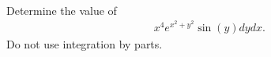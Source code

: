 \item %
\\
Determine the value of
\begin{align*}
  \mathop{\int_0^{\pi} \!\! \int_{-1}^1} x^4e^{x^2 + y^2}\sin(y) dydx.
\end{align*}
Do not use integration by parts.
\EEN %





